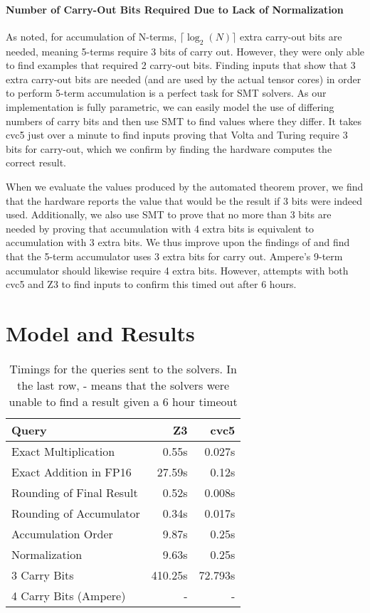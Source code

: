 \paragraph{Number of Carry-Out Bits Required Due to Lack of Normalization} As \citet{fasi2021numerical} noted, for accumulation of N-terms, $\lceil\log_2(N)\rceil$ extra carry-out bits are needed, meaning 5-terms require 3 bits of carry out. However, they were only able to find examples that required 2 carry-out bits. 
Finding inputs that show that 3 extra carry-out bits are needed (and are used by the actual tensor cores) in order to perform 5-term accumulation is a perfect task for SMT solvers.  As our implementation is fully parametric, we can easily model the use of differing numbers of carry bits and then use SMT to find values where they differ. It takes cvc5 just over a minute to find inputs proving that Volta and Turing require 3 bits for carry-out, which we confirm by finding the hardware computes the correct result. 


When we evaluate the values produced by the automated theorem prover, we find that the hardware reports the value that would be the result if 3 bits were indeed used.  Additionally, we also use SMT to prove that no more than 3 bits are needed by proving that accumulation with 4 extra bits is equivalent to accumulation with 3 extra bits. We thus improve upon the findings of \citet{fasi2021numerical} and find that the 5-term accumulator uses 3 extra bits for carry out. Ampere's 9-term accumulator should likewise require 4 extra bits. However, attempts with both cvc5 and Z3 to find inputs to confirm this timed out after 6 hours.



\section{Model and Results}

\begin{table}
\caption{\label{tab:query-timings}Timings for the queries sent to the solvers. In the last row, - means that the solvers were unable to find a result given a 6 hour timeout}
\centering
\begin{tabular}{lrr}
    \hline
    \textbf{Query} & \textbf{Z3} & \textbf{cvc5} \\
    \hline
    Exact Multiplication & 0.55s & 0.027s \\
    Exact Addition in FP16 & 27.59s & 0.12s \\
    Rounding of Final Result & 0.52s & 0.008s\\
    Rounding of Accumulator & 0.34s & 0.017s \\ 
    Accumulation Order & 9.87s & 0.25s \\
    Normalization & 9.63s & 0.25s \\
    3 Carry Bits & 410.25s & 72.793s \\
    4 Carry Bits (Ampere) & - & - \\
\hline
\end{tabular}
\end{table}

